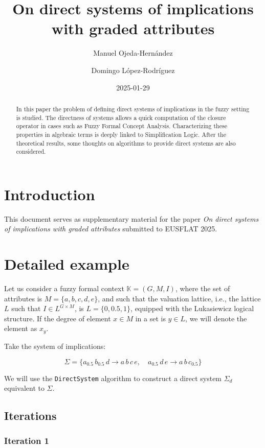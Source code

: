 \documentclass[
  letterpaper,
  DIV=11,
  numbers=noendperiod]{scrartcl}
\title{On direct systems of implications with graded attributes}
\author{Manuel Ojeda-Hernández \and Domingo López-Rodríguez}
\date{2025-01-29}
\begin{document}
\maketitle
\begin{abstract}
In this paper the problem of defining direct systems of implications in
the fuzzy setting is studied. The directness of systems allows a quick
computation of the closure operator in cases such as Fuzzy Formal
Concept Analysis. Characterizing these properties in algebraic terms is
deeply linked to Simplification Logic. After the theoretical results,
some thoughts on algorithms to provide direct systems are also
considered.
\end{abstract}


\newcommand{\el}[2]{#1_{#2}}

\section{Introduction}\label{introduction}

This document serves as supplementary material for the paper \emph{On
direct systems of implications with graded attributes} submitted to
EUSFLAT 2025.

\section{Detailed example}\label{detailed-example}

Let us consider a fuzzy formal context \(\mathbb K = (G, M, I)\), where
the set of attributes is \(M=\{a,b,c,d,e\}\), and such that the
valuation lattice, i.e., the lattice \(L\) such that
\(I\in L^{G\times M}\), is \(L=\{0, 0.5, 1\}\), equipped with the
Lukasiewicz logical structure. If the degree of element \(x\in M\) in a
set is \(y\in L\), we will denote the element as \(x_{y}\).

Take the system of implications:

\[\Sigma = \{a_{0.5}\,b_{0.5}\,d \to a\,b\,c\,e, \quad a_{0.5}\,d\,e \to a\,b\,c_{0.5}\}\]

We will use the \texttt{DirectSystem} algorithm to construct a direct
system \(\Sigma_d\) equivalent to \(\Sigma\).

\subsection{Iterations}\label{iterations}

\subsubsection{Iteration 1}\label{iteration-1}
\end{document}
